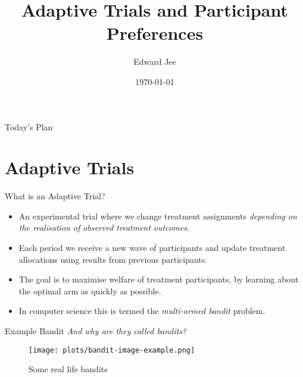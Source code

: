 \documentclass[aspectratio=169,xcolor=dvipsnames]{beamer}
\title[short title]{Adaptive Trials and Participant Preferences} %
\subtitle{}
\author[Edward Jee] {Edward Jee}
\institute[NTU] %
{
Development Tea
}
\date{\today} %
\begin{document}
\begin{frame}
    \titlepage
\end{frame}

\begin{frame}{Today's Plan}
    \tableofcontents
\end{frame}

\section{Adaptive Trials}

\begin{frame}{What is an Adaptive Trial?}

    \begin{itemize}
        \item An experimental trial where we change treatment assignments \textit{depending on the realisation of observed treatment outcomes.}
        \item Each period we receive a new wave of participants and update treatment allocations 
        using results from previous participants.
        \item The goal is to maximise welfare of treatment participants, by learning 
        about the optimal arm as quickly as possible. 
        \item In computer science this is termed the \textit{multi-armed bandit} problem.
    \end{itemize}
\end{frame}


\begin{frame}{Example Bandit}
    \textit{And why are they called bandits?}
    \begin{figure}[htbp]
        \centering
        \texttt{[image: plots/bandit-image-example.png]} 
        \caption{Some real life bandits}
        \label{<label>}
    \end{figure}
\end{frame}
\end{document}
